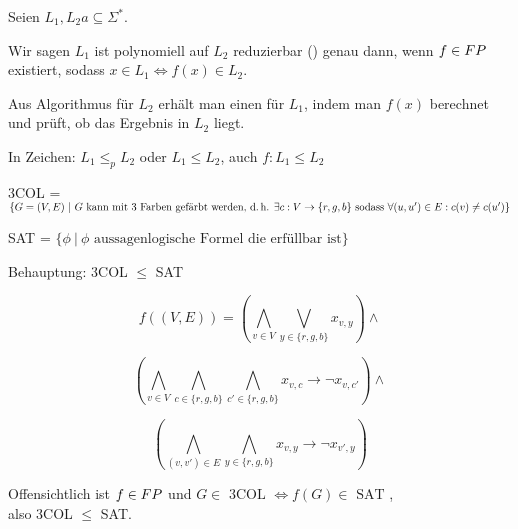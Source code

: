 \begin{definition}


    Seien $L_1, L_2a \subseteq \Sigma^\ast$.

    Wir sagen $L_1$ ist polynomiell auf $L_2$ reduzierbar () genau dann, wenn $f \in FP$ existiert, sodass $x \in L_1 \Leftrightarrow f(x) \in L_2$.

    Aus Algorithmus für $L_2$ erhält man einen für $L_1$, indem man $f(x)$ berechnet und prüft, ob das Ergebnis in $L_2$ liegt.

    In Zeichen: $L_1 \leq_p L_2$ oder $L_1 \leq L_2$, auch $f: L_1 \leq L_2$

\end{definition}


\begin{beispiel}
    
    3COL = $\{ G = (V,E)\ |\ G \text{ kann mit 3 Farben gefärbt werden, d.\,h. } \exists c: V \rightarrow \{r,g,b\} \text{ sodass } \forall (u, u') \in E: c(v) \neq c(u') \}$

    SAT = $\{ \phi\ |\ \phi \text{ aussagenlogische Formel die erfüllbar ist} \}$


    Behauptung: 3COL $\leq$ SAT






    $$f((V,E)) = \left(     \bigwedge_{v \in V} \bigvee_{y \in \{r,g,b\}}    x_{v,y}    \right)         \land     $$ 

    $$ \left(     \bigwedge_{v \in V} \bigwedge_{c \in \{r,g,b\}} \bigwedge_{c' \in \{r,g,b\}}      x_{v,c} \rightarrow \neg x_{v,c'} \right)       \land     $$

    $$ \left(     \bigwedge_{(v,v') \in E} \bigwedge_{y \in \{r,g,b\}}    x_{v,y} \rightarrow \neg x_{v', y} \right) $$
                                


    Offensichtlich ist $f \in FP$ und $G \in \text{ 3COL } \Leftrightarrow f(G) \in \text{ SAT }$,\\ also 3COL $\leq$ SAT.

\end{beispiel}



